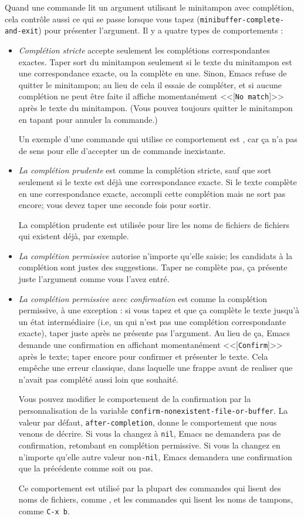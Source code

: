 Quand une commande lit un argument utilisant le minitampon avec
complétion, cela contrôle aussi ce qui se passe lorsque vous tapez
\RET (\texttt{minibuffer-complete-and-exit}) pour présenter
l'argument. Il y a quatre types de comportements :
\begin{itemize}
\item \textit{Complétion stricte} accepte seulement les complétions
  correspondantes exactes. Taper \RET sort du minitampon
  seulement si le texte du minitampon est une correspondance exacte,
  ou la complète en une. Sinon, Emacs refuse de quitter le minitampon;
  au lieu de cela il essaie de compléter, et si aucune complétion ne
  peut être faite il affiche momentanément <<[\texttt{No match}]>>
  après le texte du minitampon. (Vous pouvez toujours quitter le
  minitampon en tapant  pour annuler la commande.)

  Un exemple d'une commande qui utilise ce comportement est
  , car ça n'a pas de sens pour elle d'accepter un de
  commande inexistante.
\item \textit{La complétion prudente} est comme la complétion stricte,
  sauf que \RET sort seulement si le texte est déjà une
  correspondance exacte. Si le texte complète en une correspondance
  exacte, \RET accompli cette complétion mais ne sort pas
  encore; vous devez taper \RET une seconde fois pour sortir.

  La complétion prudente est utilisée pour lire les noms de fichiers
  de fichiers qui existent déjà, par exemple.
\item \textit{La complétion permissive} autorise n'importe qu'elle
  saisie; les candidats à la complétion sont justes des
  suggestions. Taper \RET ne complète pas, ça présente juste
  l'argument comme vous l'avez entré.
\item \textit{La complétion permissive avec confirmation} est comme la
  complétion permissive, à une exception : si vous tapez \TAB
  et que ça complète le texte jusqu'à un état intermédiaire (i.e, un
  qui n'est pas une complétion correspondante exacte), taper
  \RET juste après ne présente pas l'argument. Au lieu de ça,
  Emacs demande une confirmation en affichant momentanément
  <<[\texttt{Confirm}]>> après le texte; taper \RET encore
  pour confirmer et présenter le texte. Cela empêche une erreur
  classique, dans laquelle une frappe \RET avant de realiser
  que \TAB n'avait pas complété aussi loin que souhaité.

  Vous pouvez modifier le comportement de la confirmation par la
  personnalisation de la variable
  \texttt{confirm-nonexistent-file-or-buffer}. La valeur par défaut,
  \texttt{after-completion}, donne le comportement que nous venons de
  décrire. Si vous la changez à \texttt{nil}, Emacs ne demandera pas
  de confirmation, retombant en complétion permissive. Si vous la
  changez en n'importe qu'elle autre valeur non\texttt{-nil}, Emacs
  demandera une confirmation que la précédente comme soit \TAB
  ou pas.

  Ce comportement est utilisé par la plupart des commandes qui lisent
  des noms de fichiers, comme , et les commandes qui
  lisent les noms de tampons, comme \texttt{C-x b}.
\end{itemize}

